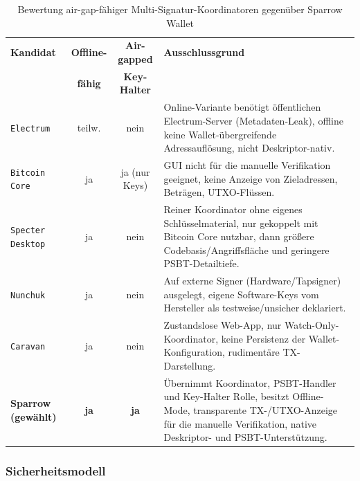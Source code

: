 \begin{table}[htbp]
\centering
\footnotesize
\renewcommand{\arraystretch}{1.3}
\begin{tabularx}{\linewidth}{@{} l c c >{\RaggedRight}X @{}}
\toprule
\textbf{Kandidat} & \textbf{Offline-} & \textbf{Air-gapped} & \textbf{Ausschlussgrund} \\
                  & \textbf{fähig}    & \textbf{Key-Halter} & \\
\midrule
\texttt{Electrum} & teilw. & nein
  & Online-Variante benötigt öffentlichen Electrum-Server (Metadaten-Leak),
    offline keine Wallet-übergreifende Adressauflösung, nicht Deskriptor-nativ.\cite{electrum_docs} \\
\addlinespace
\texttt{Bitcoin Core} & ja & ja (nur Keys)
  & \ac{GUI} nicht für die manuelle Verifikation geeignet, keine Anzeige von Zieladressen, Beträgen, \ac{UTXO}-Flüssen. \\
\addlinespace
\texttt{Specter Desktop} & ja & nein
  & Reiner Koordinator ohne eigenes Schlüsselmaterial, nur gekoppelt mit
    Bitcoin Core nutzbar, dann größere Codebasis/Angriffsfläche und geringere
    \ac{PSBT}-Detailtiefe.\cite{specter_devices,specter_faq_hotwallet} \\
\addlinespace
\texttt{Nunchuk} & ja & nein
  & Auf externe Signer (Hardware/Tapsigner) ausgelegt, eigene Software-Keys
    vom Hersteller als testweise/unsicher deklariert.\cite{nunchuk_desktop, nunchuk_software_key} \\
\addlinespace
\texttt{Caravan} & ja & nein
  & Zustandslose Web-App, nur Watch-Only-Koordinator, keine Persistenz der
    Wallet-Konfiguration, rudimentäre \ac{TX}-Darstellung.\cite{caravan_github, caravan_multiSig} \\
\midrule
\textbf{Sparrow (gewählt)} & \textbf{ja} & \textbf{ja}
  & Übernimmt Koordinator, \ac{PSBT}-Handler und Key-Halter Rolle, besitzt Offline-Mode, transparente
    \ac{TX}-/\ac{UTXO}-Anzeige für die manuelle Verifikation, native Deskriptor- und \ac{PSBT}-Unterstützung. \\
\bottomrule
\end{tabularx}
\caption{Bewertung air-gap-fähiger Multi-Signatur-Koordinatoren gegenüber Sparrow Wallet\cite{knowingbitcoin_coordinators}}
\label{tab:sparrow_alternativen}
\end{table}


\subsubsection{Sicherheitsmodell}

